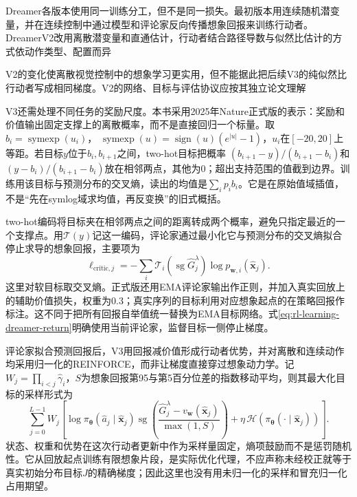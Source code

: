 Dreamer各版本使用同一训练分工，但不是同一损失。最初版本用连续随机潜变量，并在连续控制中通过模型和评论家反向传播想象回报来训练行动者。DreamerV2改用离散潜变量和直通估计，行动者结合路径导数与似然比估计的方式依动作类型、配置而异

V2的变化使离散视觉控制中的想象学习更实用，但不能据此把后续V3的纯似然比行动者写成相同梯度。V2的网络、目标与评估协议应按其独立论文理解

V3还需处理不同任务的奖励尺度。本书采用2025年Nature正式版的表示：奖励和价值输出固定支撑上的离散概率，而不是直接回归一个标量。取
$b_i=\operatorname{symexp}(u_i)$，
$\operatorname{symexp}(u)=\operatorname{sign}(u)(e^{|u|}-1)$，$u_i$在$[-20,20]$上等距。若目标$y$位于$b_i,b_{i+1}$之间，two-hot目标把概率
$(b_{i+1}-y)/(b_{i+1}-b_i)$和
$(y-b_i)/(b_{i+1}-b_i)$放在相邻两点，其他为0；超出支持范围的值截到边界。训练用该目标与预测分布的交叉熵，读出的均值是$\sum_i p_i b_i$。它是在原始值域插值，不是“先在symlog域求均值，再反变换”的旧式概括。

two-hot编码将目标夹在相邻两点之间的距离转成两个概率，避免只指定最近的一个支撑点。用$\mathcal T(y)$记这一编码，评论家通过最小化它与预测分布的交叉熵拟合停止求导的想象回报，主要项为
\[
  \ell_{\mathrm{critic},j}
    =-\sum_i\mathcal T_i(\operatorname{sg}\widehat G_j^\lambda)
                   \log p_{\bm w,i}(\widehat{\bm x}_j).
\]
这里对软目标取交叉熵。正式版还用EMA评论家输出作正则，并加入真实回放上的辅助价值损失，权重为$0.3$；真实序列的目标利用对应想象起点的在策略回报作标注。这不同于把所有回报自举值统一替换为EMA目标网络。式\eqref{eq:rl-learning-dreamer-return}明确使用当前评论家，监督目标一侧停止梯度。

评论家拟合预测回报后，V3用回报减价值形成行动者优势，并对离散和连续动作均采用归一化的REINFORCE，而非让梯度直接穿过想象动力学。记
$W_j=\prod_{i<j}\widehat\gamma_i$，$S$为想象回报第95与第5百分位差的指数移动平均，则其最大化目标的采样形式为
\begin{equation}
 \sum_{j=0}^{L-1}W_j\left[
   \log\pi_{\bm\theta}(\widehat a_j\mid\widehat{\bm x}_j)
   \operatorname{sg}\left(
       \frac{\widehat G_j^\lambda-v_{\bm w}(\widehat{\bm x}_j)}
            {\max(1,S)}\right)
     +\eta\,\mathcal H(\pi_{\bm\theta}(\cdot\mid\widehat{\bm x}_j))
                       \right].
 \label{eq:rl-learning-dreamer-actor}
\end{equation}
状态、权重和优势在这次行动者更新中作为采样量固定，熵项鼓励而不是惩罚随机性。它从回放起点训练有限想象片段，是实际优化代理，不应声称未经校正就等于真实初始分布目标$J$的精确梯度；因此这里也没有用未归一化的采样和冒充归一化占用期望。

